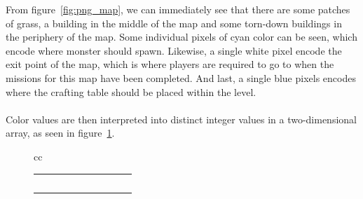 From figure~\ref{fig:png_map}, we can immediately see that there are some
patches of grass, a building in the middle of the map and some torn-down
buildings in the periphery of the map. Some individual pixels of cyan color can
be seen, which encode where monster should spawn. Likewise, a single white
pixel encode the exit point of the map, which is where players are required to
go to when the missions for this map have been completed. And last, a single
blue pixels encodes where the crafting table should be placed within the level.
\\
\\
Color values are then interpreted into distinct integer values in a
two-dimensional array, as seen in figure~\ref{fig:png_to_array}.
\begin{figure}[H]
    \centering
    \label{fig:png_to_array}
\begin{tabular}{cc}
    {\footnotesize
\setlength{\tabcolsep}{4.5pt}
  \begin{tabular}{|c|c|c|c|c|c|c|c|c|c|}
    \hline
    \cellcolor{black} & \cellcolor{black} & \cellcolor{black} &
    \cellcolor{black} & \cellcolor{black} & \cellcolor{red} &
    \cellcolor{red} & \cellcolor{red} & \cellcolor{red} &
    \cellcolor{red} \\ \hline
    \cellcolor{green} & \cellcolor{green} & \cellcolor{black} &
    \cellcolor{black} & \cellcolor{black} & \cellcolor{yellow} &
    \cellcolor{red} & \cellcolor{red} & \cellcolor{red} &
    \cellcolor{red} \\ \hline
    \cellcolor{green} & \cellcolor{green} & \cellcolor{green} &
    \cellcolor{black} & \cellcolor{black} & \cellcolor{yellow} &
    \cellcolor{red} & \cellcolor{red} & \cellcolor{red} &
    \cellcolor{red} \\ \hline
    \cellcolor{green} & \cellcolor{green} & \cellcolor{green} &
    \cellcolor{black} & \cellcolor{black} & \cellcolor{yellow} &
    \cellcolor{red} & \cellcolor{red} & \cellcolor{red} &
    \cellcolor{red} \\ \hline
    \cellcolor{green} & \cellcolor{green} & \cellcolor{green} &
    \cellcolor{black} & \cellcolor{black} & \cellcolor{yellow} &
    \cellcolor{yellow} & \cellcolor{red} & \cellcolor{red} &
    \cellcolor{yellow} \\ \hline
    \cellcolor{green} & \cellcolor{green} & \cellcolor{green} &
    \cellcolor{black} & \cellcolor{black} & \cellcolor{black} &
    \cellcolor{black} & \cellcolor{black} & \cellcolor{black} &
    \cellcolor{black} \\ \hline

\end{tabular}}
\end{tabular}
\end{figure}
